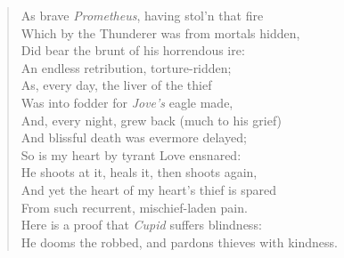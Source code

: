 \documentclass[b6paper, oneside]{memoir}
\begin{document}
\PoemTitle{}
\begin{verse}
    As brave \textit{Prometheus}, having stol'n that fire \\
    Which by the Thunderer was from mortals hidden, \\
    Did bear the brunt of his horrendous ire: \\
    An endless retribution, torture-ridden; \\
    As, every day, the liver of the thief \\
    Was into fodder for \textit{Jove's} eagle made, \\
    And, every night, grew back (much to his grief) \\
    And blissful death was evermore delayed; \\
    So is my heart by tyrant Love ensnared: \\
    He shoots at it, heals it, then shoots again, \\
    And yet the heart of my heart's thief is spared \\
    From such recurrent, mischief-laden pain. \\
    \vin Here is a proof that \textit{Cupid} suffers blindness: \\
    \vin He dooms the robbed, and pardons thieves with kindness.
\end{verse}
    
\end{document}

